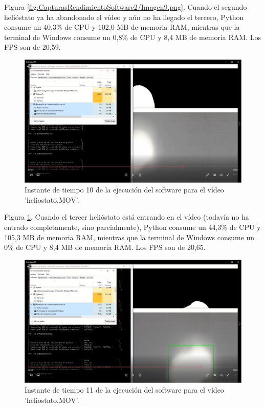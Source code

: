 Figura \ref{fig:CapturasRendimientoSoftware2/Imagen9.png}. Cuando el segundo helióstato ya ha abandonado el vídeo y aún no ha llegado el tercero, Python consume un 40,3\% de CPU y 102,0 MB de memoria RAM, mientras que la terminal de Windows consume un 0,8\% de CPU y 8,4 MB de memoria RAM. Los FPS son de 20,59.\\[20pt]

\begin{figure}[h!]
  	\centering
	\includegraphics[width=\textwidth]{CapturasRendimientoSoftware2/Imagen10.png}
	\caption{Instante de tiempo 10 de la ejecución del software para el vídeo 'heliostato.MOV'.
	\label{fig:CapturasRendimientoSoftware2/Imagen10.png}}
\end{figure}

Figura \ref{fig:CapturasRendimientoSoftware2/Imagen10.png}. Cuando el tercer helióstato está entrando en el vídeo (todavía no ha entrado completamente, sino parcialmente), Python consume un 44,3\% de CPU y 105,3 MB de memoria RAM, mientras que la terminal de Windows consume un 0\% de CPU y 8,4 MB de memoria RAM. Los FPS son de 20,65.\\[20pt]

\begin{figure}[h!]
  	\centering
	\includegraphics[width=\textwidth]{CapturasRendimientoSoftware2/Imagen11.png}
	\caption{Instante de tiempo 11 de la ejecución del software para el vídeo 'heliostato.MOV'.
	\label{fig:CapturasRendimientoSoftware2/Imagen11.png}}
\end{figure}

